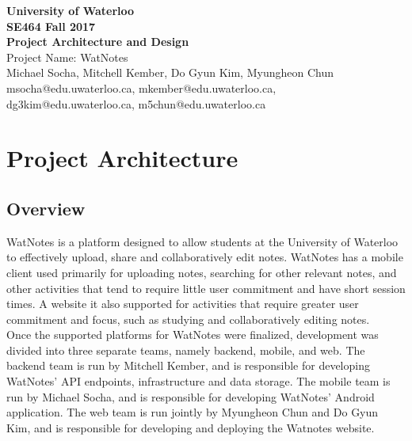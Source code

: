 \documentclass[12pt]{article}
\begin{document}
  \begin{center}
  \vspace*{\fill}
  {\Large\bf University of Waterloo}\\
  \vspace{3mm}
  {\large\bf SE464 Fall 2017}\\
  \vspace{3mm}
  {\Large\bf Project Architecture and Design}\\
  \vspace{5mm}
  {\Large Project Name: WatNotes}\\
  \vspace{5mm}
  Michael Socha, Mitchell Kember, Do Gyun Kim, Myungheon Chun\\
  \vspace{3mm}
  msocha@edu.uwaterloo.ca, mkember@edu.uwaterloo.ca, dg3kim@edu.uwaterloo.ca, m5chun@edu.uwaterloo.ca\\
  \vspace*{\fill}
  \end{center}

  \newpage

  \section{Project Architecture}
  \subsection{Overview}
    WatNotes is a platform designed to allow students at the University of Waterloo to effectively upload, share
    and collaboratively edit notes. WatNotes has a mobile client used primarily for uploading notes, searching for
    other relevant notes, and other activities that tend to require little user commitment and have short session times.
    A website it also supported for activities that require greater user commitment and focus, such as studying and
    collaboratively editing notes. \\

    Once the supported platforms for WatNotes were finalized, development was divided into three separate teams, namely
    backend, mobile, and web. The backend team is run by Mitchell Kember, and is responsible for developing WatNotes' API
    endpoints, infrastructure and data storage. The mobile team is run by Michael Socha, and is responsible for developing
    WatNotes' Android application. The web team is run jointly by Myungheon Chun and Do Gyun Kim, and is responsible for
    developing and deploying the Watnotes website. \\
\end{document}

